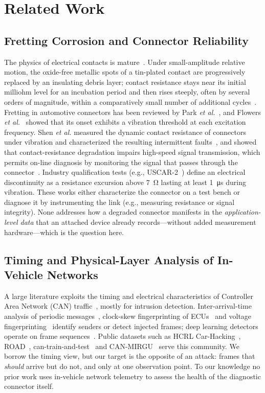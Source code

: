 \section{Related Work}
\label{sec:related}

\subsection{Fretting Corrosion and Connector Reliability}
The physics of electrical contacts is mature~\cite{holm,braunovic}. Under
small-amplitude relative motion, the oxide-free metallic spots of a
tin-plated contact are progressively replaced by an insulating debris layer;
contact resistance stays near its initial milliohm level for an incubation
period and then rises steeply, often by several orders of magnitude, within
a comparatively small number of additional cycles~\cite{antler1985,
bryant1994,park2008}. Fretting in automotive connectors has been reviewed
by Park \emph{et al.}~\cite{park2006ijat}, and Flowers \emph{et
al.}~\cite{flowers2004} showed that its onset exhibits a vibration
threshold at each excitation frequency. Shen \emph{et al.} measured the
dynamic contact resistance of connectors under vibration and characterized
the resulting intermittent faults~\cite{shen2018tcpmt}, and showed that
contact-resistance degradation impairs high-speed signal transmission,
which permits on-line diagnosis by monitoring the signal that passes
through the connector~\cite{shen2017access}. Industry
qualification tests (e.g., USCAR-2~\cite{uscar2}) define an electrical
discontinuity as a resistance excursion above \SI{7}{\ohm} lasting at least
\SI{1}{\micro\second} during vibration. These works either characterize the
connector on a test bench or diagnose it by instrumenting the link (e.g.,
measuring resistance or signal integrity). None addresses how a degraded
connector manifests in the \emph{application-level data} that an attached
device already records---without added measurement hardware---which is
the question here.

\subsection{Timing and Physical-Layer Analysis of In-Vehicle Networks}
A large literature exploits the timing and electrical characteristics of
Controller Area Network (CAN) traffic~\cite{bosch_can,iso11898}, mostly for
intrusion detection. Inter-arrival-time analysis of periodic
messages~\cite{song2016}, clock-skew fingerprinting of ECUs~\cite{cho_cids}
and voltage fingerprinting~\cite{murvay2014,cho_viden,voltageids,scission,
ecuprint} identify senders or detect injected frames; deep learning
detectors operate on frame sequences~\cite{kang2016,taylor2016,canet}.
Public datasets such as HCRL Car-Hacking~\cite{hcrl_gids},
ROAD~\cite{road}, can-train-and-test~\cite{cantrain} and
CAN-MIRGU~\cite{mirgu} serve this community. We borrow the timing view, but
our target is the opposite of an attack: frames that \emph{should} arrive
but do not, and only at one observation point. To our knowledge no prior
work uses in-vehicle network telemetry to assess the health of the
diagnostic connector itself.

